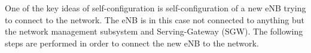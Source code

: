 \documentclass{report}
\begin{document}
One of the key ideas of self-configuration is self-configuration of a new eNB trying to connect to the network. The eNB is in this case not connected to anything but the network management subsystem and Serving-Gateway (SGW). The following steps are performed in order to connect the new eNB to the network. 
\end{document}

